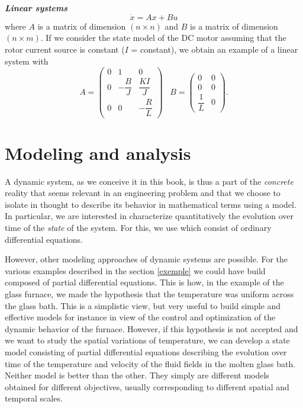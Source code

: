\noindent \textbf{\textit{Linear systems}}
$$
\dot x = Ax +Bu
$$
where $A$ is a matrix of dimension $(n \times n)$ and $B$ is a matrix of dimension $(n \times m)$.  If we consider the state model of the DC motor assuming that the rotor current source is constant ($I$ = constant), we obtain an example of a linear system with
\begin{equation*}
A = \left( \begin{array}{ccc}
0 & 1 & 0 \\[0.3em] 0 &-\dfrac{B}{J} & \dfrac{KI}{J}\\[0.9em]
0&0& -\dfrac{R}{L}
\end{array}
\right)\;\;\; B = \left(\begin{array}{cc} 0 & 0 \\[0.3em] 0 & 0 \\[0.3em] \dfrac{1}{L}&0
\end{array} \right).
\end{equation*}
\vv

\section{Modeling and analysis}

A dynamic system, as we conceive it in this book, is thus a part of the {\it concrete} reality that seems relevant in an engineering problem and that we choose to isolate in thought to describe its behavior in mathematical terms using a model. In particular, we are interested in characterize quantitatively the evolution over time of the {\it state} of the system. For this, we use  which consist of ordinary differential equations.

However, other modeling approaches of dynamic systems are possible. For the various examples described in the section \ref{exemple} we could have  build  composed of partial differential equations. This is how, in the example of the glass furnace, we made the hypothesis that the temperature was uniform across the glass bath. This is a simplistic view, but very useful to build simple and effective models for instance in view of the control and optimization of the dynamic behavior of the furnace. However, if this hypothesis is not accepted and we want to study the spatial variations of temperature, we can develop a state model consisting of partial differential equations describing the evolution over time of the temperature and velocity of the fluid fields in the molten glass bath. Neither model is better than the other. They simply are different models obtained for different objectives, usually corresponding to different spatial and temporal scales.

